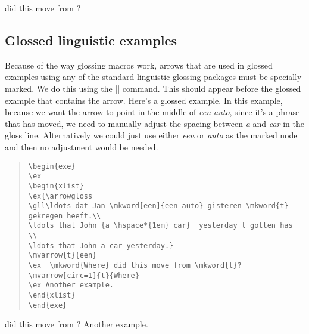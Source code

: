 \documentclass[11pt]{article}
\begin{document}
\begin{exe}
\arrowstrut
\ex  {} did 
this move from ?

\end{exe}

\subsection{Glossed linguistic examples}
Because of the way glossing macros work, arrows that are used in glossed examples using any of the standard linguistic glossing packages must be specially marked. We do this using the |\arrowgloss| command. This should appear before the glossed example that contains the arrow.  Here’s a glossed example. In this example, because we want the arrow to point in the middle of \emph{een auto}, since it’s a phrase that has moved, we need to manually adjust the spacing between \emph{a} and \emph{car} in the gloss line. Alternatively we could just use either \emph{een} or \emph{auto} as the marked node and then no adjustment would be needed. 

\begin{quote}
\begin{lstlisting}
\begin{exe}
\ex
\begin{xlist}
\ex{\arrowgloss
\gll\ldots dat Jan \mkword[een]{een auto} gisteren \mkword{t}  gekregen heeft.\\
\ldots that John {a \hspace*{1em} car}  yesterday t gotten has \\
\ldots that John a car yesterday.}
\mvarrow{t}{een}
\ex  \mkword{Where} did this move from \mkword{t}?
\mvarrow[circ=1]{t}{Where}
\ex Another example.
\end{xlist}
\end{exe}
\end{lstlisting}
\end{quote}

\begin{exe}
\ex
\begin{xlist}
\ex  {} did this move from ?
\ex Another example.
\end{xlist}
\end{exe}
\end{document}
